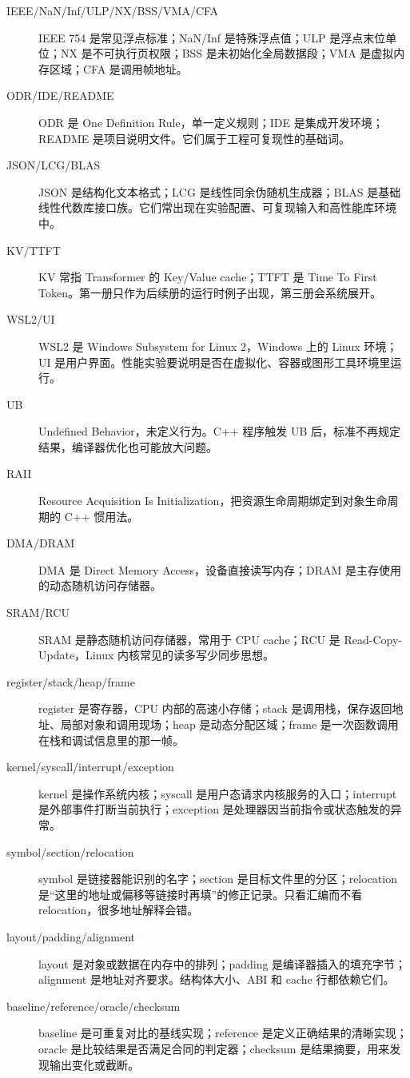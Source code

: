 \begin{description}
  \item[IEEE/NaN/Inf/ULP/NX/BSS/VMA/CFA] IEEE 754 是常见浮点标准；NaN/Inf 是特殊浮点值；ULP 是浮点末位单位；NX 是不可执行页权限；BSS 是未初始化全局数据段；VMA 是虚拟内存区域；CFA 是调用帧地址。
  \item[ODR/IDE/README] ODR 是 One Definition Rule，单一定义规则；IDE 是集成开发环境；README 是项目说明文件。它们属于工程可复现性的基础词。
  \item[JSON/LCG/BLAS] JSON 是结构化文本格式；LCG 是线性同余伪随机生成器；BLAS 是基础线性代数库接口族。它们常出现在实验配置、可复现输入和高性能库环境中。
  \item[KV/TTFT] KV 常指 Transformer 的 Key/Value cache；TTFT 是 Time To First Token。第一册只作为后续册的运行时例子出现，第三册会系统展开。
  \item[WSL2/UI] WSL2 是 Windows Subsystem for Linux 2，Windows 上的 Linux 环境；UI 是用户界面。性能实验要说明是否在虚拟化、容器或图形工具环境里运行。
  \item[UB] Undefined Behavior，未定义行为。C++ 程序触发 UB 后，标准不再规定结果，编译器优化也可能放大问题。
  \item[RAII] Resource Acquisition Is Initialization，把资源生命周期绑定到对象生命周期的 C++ 惯用法。
  \item[DMA/DRAM] DMA 是 Direct Memory Access，设备直接读写内存；DRAM 是主存使用的动态随机访问存储器。
  \item[SRAM/RCU] SRAM 是静态随机访问存储器，常用于 CPU cache；RCU 是 Read-Copy-Update，Linux 内核常见的读多写少同步思想。
  \item[register/stack/heap/frame] register 是寄存器，CPU 内部的高速小存储；stack 是调用栈，保存返回地址、局部对象和调用现场；heap 是动态分配区域；frame 是一次函数调用在栈和调试信息里的那一帧。
  \item[kernel/syscall/interrupt/exception] kernel 是操作系统内核；syscall 是用户态请求内核服务的入口；interrupt 是外部事件打断当前执行；exception 是处理器因当前指令或状态触发的异常。
  \item[symbol/section/relocation] symbol 是链接器能识别的名字；section 是目标文件里的分区；relocation 是“这里的地址或偏移等链接时再填”的修正记录。只看汇编而不看 relocation，很多地址解释会错。
  \item[layout/padding/alignment] layout 是对象或数据在内存中的排列；padding 是编译器插入的填充字节；alignment 是地址对齐要求。结构体大小、ABI 和 cache 行都依赖它们。
  \item[baseline/reference/oracle/checksum] baseline 是可重复对比的基线实现；reference 是定义正确结果的清晰实现；oracle 是比较结果是否满足合同的判定器；checksum 是结果摘要，用来发现输出变化或截断。

\end{description}
